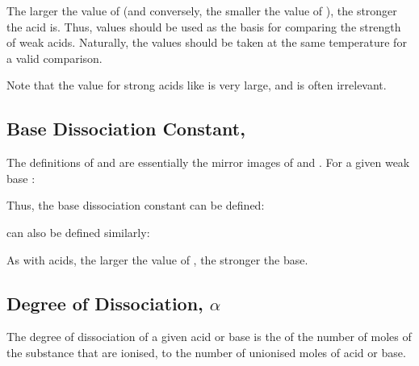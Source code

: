 			\eqndiagram{
				\[ pK_{a} = -lg(K_{a}) \]
			}

			The larger the value of \Ka{} (and conversely, the smaller the value of \pKa{}), the stronger the acid is. Thus, \Ka{}
			values should be used as the basis for comparing the strength of weak acids. Naturally, the \Ka{} values should be
			taken at the same temperature for a valid comparison.

			Note that the \Ka{} value for strong acids like  is very large, and is often irrelevant.





		\pagebreak
		\subsection{Base Dissociation Constant, \texorpdfstring{\Kb{}}{Kb}}

			The definitions of \Kb{} and \pKb{} are essentially the mirror images of \Ka{} and \pKa{}. For a given weak base :


			Thus, the base dissociation constant \Kb{} can be defined:

			\eqndiagram{
				\[ K_{a} = \frac{[\ch{BH+}][\ch{OH-}]}{[\ch{B}]} \]
			}

			\pKb{} can also be defined similarly:

			\eqndiagram{
				\[ pK_{b} = -lg(K_{b}) \]
			}

			As with acids, the larger the value of \Kb{}, the stronger the base.



		\subsection{Degree of Dissociation, \texorpdfstring{$\alpha$}{a}}

			The degree of dissociation of a given acid or base is the  of the number of moles of the substance that are ionised, to
			the number of unionised moles of acid or base.

			\eqndiagram{
				\[ \alpha = \cfrac{[\mathrm{acid}]_{dissoc}}{[\mathrm{acid}]_{initial}} \]
			}

